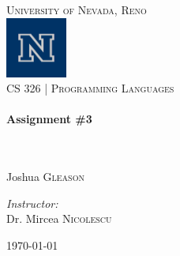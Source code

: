 


\begin{titlepage}
\begin{center}

\textsc{\LARGE University of Nevada, Reno}\\[.5cm]
\includegraphics[width=0.15\textwidth]{./logo.png}\\[.5cm]

\textsc{\large CS 326 | Programming Languages } \\[.5cm]

\HRule \\[0.4cm]
{ \huge \bfseries Assignment \#3}\\[0.4cm]

\HRule \\[1.5cm]

\begin{minipage}{0.4\textwidth}
\begin{flushleft} \large
\emph{}\\
    Joshua \textsc{Gleason}\\
    \end{flushleft}
    \end{minipage}
    \begin{minipage}{0.4\textwidth}
    \begin{flushright} \large
    \emph{Instructor:} \\
      Dr. Mircea \textsc{Nicolescu}
      \end{flushright}
      \end{minipage}

      \vspace*{\fill}

      

      \vspace*{\fill}

{\large \today}

\end{center}

\end{titlepage}

